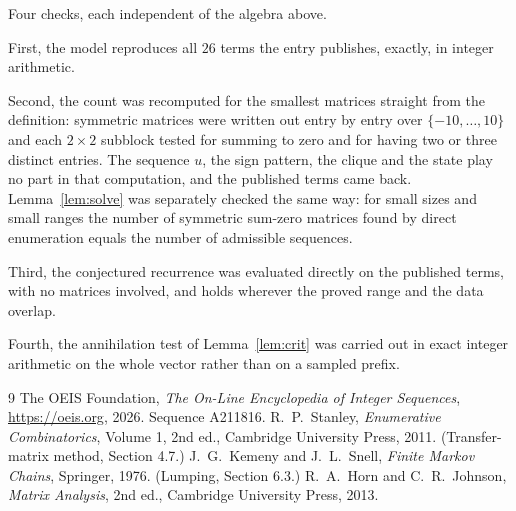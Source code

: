 \documentclass[11pt,a4paper]{article}
\theoremstyle{plain}
\theoremstyle{definition}
\begin{document}
Four checks, each independent of the algebra above.

First, the model reproduces all $26$ terms the entry publishes, exactly, in integer
arithmetic.

Second, the count was recomputed for the smallest matrices straight from the definition:
symmetric matrices were written out entry by entry over $\{-10,\dots,10\}$ and each
$2\times2$ subblock tested for summing to zero and for having two or three distinct entries. The
sequence $u$, the sign pattern, the clique and the state play no part in that computation, and
the published terms came back. Lemma~\ref{lem:solve} was separately checked the same way: for
small sizes and small ranges the number of symmetric sum-zero matrices found by direct
enumeration equals the number of admissible sequences.

Third, the conjectured recurrence was evaluated directly on the published terms, with no
matrices involved, and holds wherever the proved range and the data overlap.

Fourth, the annihilation test of Lemma~\ref{lem:crit} was carried out in exact integer
arithmetic on the whole vector rather than on a sampled prefix.

\begin{thebibliography}{9}
 The OEIS Foundation, \emph{The On-Line Encyclopedia of Integer
Sequences}, \url{https://oeis.org}, 2026. Sequence A211816.
 R.~P.~Stanley, \emph{Enumerative Combinatorics}, Volume 1, 2nd ed.,
Cambridge University Press, 2011. (Transfer-matrix method, Section 4.7.)
 J.~G.~Kemeny and J.~L.~Snell, \emph{Finite Markov Chains}, Springer, 1976.
(Lumping, Section 6.3.)
 R.~A.~Horn and C.~R.~Johnson, \emph{Matrix Analysis}, 2nd ed., Cambridge
University Press, 2013.
\end{thebibliography}
\end{document}
